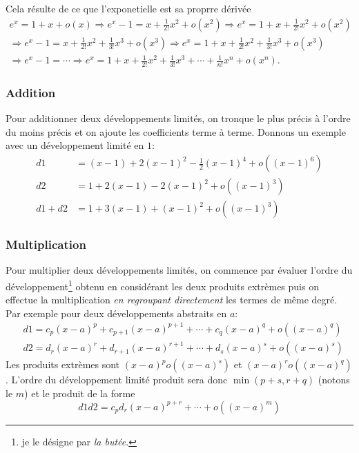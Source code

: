 \begin{exple}
  Cela résulte de ce que l'exponetielle est sa proprre dérivée
\begin{multline*}
  e^x = 1 + x + o(x) \Rightarrow e^x - 1 = x + \frac{1}{2!}x^2 + o(x^2)
  \Rightarrow e^x = 1 + x + \frac{1}{2!}x^2 + o(x^2) \\
  \Rightarrow e^x - 1 =  x + \frac{1}{2!}x^2 + \frac{1}{3!}x^3 +o(x^3) 
  \Rightarrow e^x = 1 +  x + \frac{1}{2!}x^2 + \frac{1}{3!}x^3 +o(x^3)\\
  \Rightarrow e^x -1 = \cdots  \Rightarrow e^x = 1 +  x + \frac{1}{2!}x^2 + \frac{1}{3!}x^3 + \cdots + \frac{1}{n!}x^n + o(x^n).
\end{multline*}

\end{exple}

\subsubsection{Addition}
Pour additionner deux développements limités, on tronque le plus précis à l'ordre du moins précis et on ajoute les coefficients terme à terme. Donnons un exemple avec un développement limité en $1$:
\begin{align*}
 d1 &= (x-1) + 2(x-1)^2 -\frac{1}{2}(x-1)^4+o((x-1)^6)\\
 d2 &= 1+2(x-1) - 2(x-1)^2 +o((x-1)^3)\\
d1+d2 &= 1 +3(x-1) +(x-1)^2+o((x-1)^3)
\end{align*}

\subsubsection{Multiplication}
Pour multiplier deux développements limités, on commence par évaluer l'ordre du développement\footnote{je le désigne par \emph{la butée}.} obtenu en considérant les deux produits extrèmes puis on effectue la multiplication \emph{en regroupant directement} les termes de même degré.\newline
Par exemple pour deux développements abstraits en $a$:
\begin{align*}
 &d1 = c_p(x-a)^p+c_{p+1}(x-a)^{p+1}+\cdots +c_q(x-a)^q+o\left((x-a)^q\right)\\
 &d2 = d_r(x-a)^r+d_{r+1}(x-a)^{r+1}+\cdots +d_s(x-a)^s+o\left((x-a)^s\right)
\end{align*}
Les produits extrèmes sont $(x-a)^po\left((x-a)^s\right)$ et $(x-a)^ro\left((x-a)^q\right)$. L'ordre du développement limité produit sera donc $\min(p+s,r+q)$ (notons le $m$) et le produit de la forme
\begin{displaymath}
 d1d2 = c_pd_r(x-a)^{p+r} + \cdots +o\left((x-a)^m \right) 
\end{displaymath}


